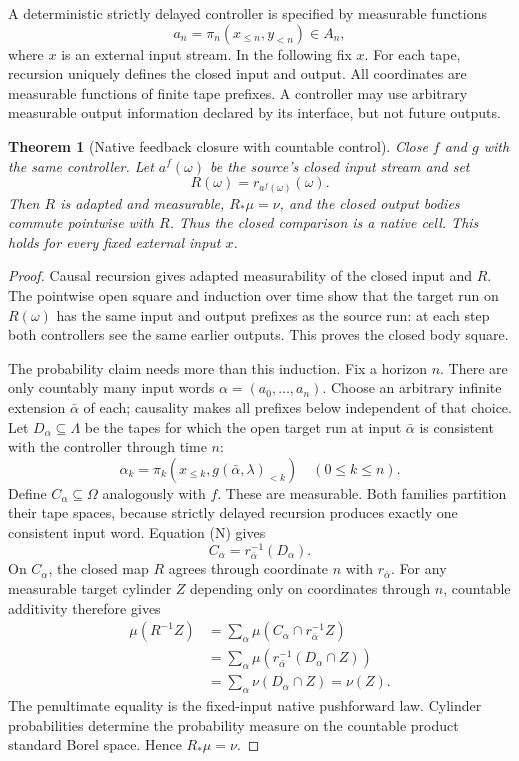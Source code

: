 \documentclass[11pt]{article}
\newtheorem{theorem}{Theorem}[section]
\begin{document}
A deterministic strictly delayed controller is specified by measurable functions
\[
 a_n=\pi_n(x_{\le n},y_{<n})\in A_n,
\]
where $x$ is an external input stream. In the following fix $x$. For each tape, recursion uniquely defines the closed input and output. All coordinates are measurable functions of finite tape prefixes. A controller may use arbitrary measurable output information declared by its interface, but not future outputs.

\begin{theorem}[Native feedback closure with countable control]\label{countable:main}
Close $f$ and $g$ with the same controller. Let $a^f(\omega)$ be the source's closed input stream and set
\[
 R(\omega)=r_{a^f(\omega)}(\omega).
\]
Then $R$ is adapted and measurable, $R_*\mu=\nu$, and the closed output bodies commute pointwise with $R$. Thus the closed comparison is a native cell. This holds for every fixed external input $x$.
\end{theorem}
\begin{proof}
Causal recursion gives adapted measurability of the closed input and $R$. The pointwise open square and induction over time show that the target run on $R(\omega)$ has the same input and output prefixes as the source run: at each step both controllers see the same earlier outputs. This proves the closed body square.

The probability claim needs more than this induction. Fix a horizon $n$. There are only countably many input words $\alpha=(a_0,\ldots,a_n)$. Choose an arbitrary infinite extension $\bar\alpha$ of each; causality makes all prefixes below independent of that choice. Let $D_\alpha\subseteq\Lambda$ be the tapes for which the open target run at input $\bar\alpha$ is consistent with the controller through time $n$:
\[
 \alpha_k=\pi_k(x_{\le k},g(\bar\alpha,\lambda)_{<k})
 \quad(0\le k\le n).
\]
Define $C_\alpha\subseteq\Omega$ analogously with $f$. These are measurable. Both families partition their tape spaces, because strictly delayed recursion produces exactly one consistent input word. Equation (N) gives
\[
 C_\alpha=r_{\bar\alpha}^{-1}(D_\alpha).
\]
On $C_\alpha$, the closed map $R$ agrees through coordinate $n$ with $r_{\bar\alpha}$. For any measurable target cylinder $Z$ depending only on coordinates through $n$, countable additivity therefore gives
\begin{align*}
 \mu(R^{-1}Z)
 &=\sum_\alpha\mu(C_\alpha\cap r_{\bar\alpha}^{-1}Z)\\
 &=\sum_\alpha\mu(r_{\bar\alpha}^{-1}(D_\alpha\cap Z))\\
 &=\sum_\alpha\nu(D_\alpha\cap Z)=\nu(Z).
\end{align*}
The penultimate equality is the fixed-input native pushforward law. Cylinder probabilities determine the probability measure on the countable product standard Borel space. Hence $R_*\mu=\nu$.
\end{proof}
\end{document}
